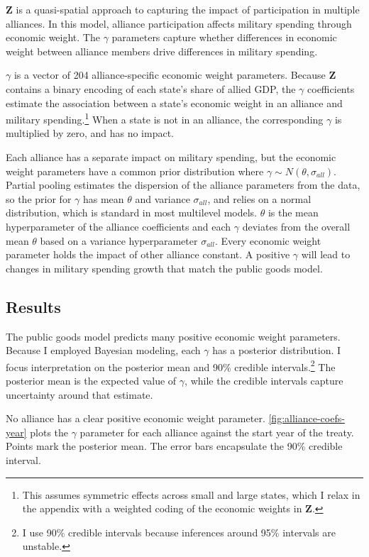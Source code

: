 \documentclass[12pt]{article}
\begin{document}
$\textbf{Z}$ is a quasi-spatial approach to capturing the impact of participation in multiple alliances.
In this model, alliance participation affects military spending through economic weight.  
The $\gamma$ parameters capture whether differences in economic weight between alliance members drive differences in military spending. 


$\gamma$ is a vector of 204 alliance-specific economic weight parameters.  
Because \textbf{Z} contains a binary encoding of each state's share of allied GDP, the $\gamma$ coefficients estimate the association between a state's economic weight in an alliance and military spending.\footnote{This assumes symmetric effects across small and large states, which I relax in the appendix with a weighted coding of the economic weights in $\textbf{Z}$.} 
When a state is not in an alliance, the corresponding $\gamma$ is multiplied by zero, and has no impact. 


Each alliance has a separate impact on military spending, but the economic weight parameters have a common prior distribution where $\gamma \sim N(\theta, \sigma_{all})$.
Partial pooling estimates the dispersion of the alliance parameters from the data, so the prior for $\gamma$ has mean $\theta$ and variance $\sigma_{all}$, and relies on a normal distribution, which is standard in most multilevel models.  
$\theta$ is the mean hyperparameter of the alliance coefficients and each $\gamma$ deviates from the overall mean $\theta$ based on a variance hyperparameter $\sigma_{all}$.
Every economic weight parameter holds the impact of other alliance constant. 
A positive $\gamma$ will lead to changes in military spending growth that match the public goods model. 
    


\subsection{Results} 


The public goods model predicts many positive economic weight parameters. 
Because I employed Bayesian modeling, each $\gamma$ has a posterior distribution.
I focus interpretation on the posterior mean and 90\% credible intervals.\footnote{I use 90\% credible intervals because inferences around 95\% intervals are unstable.}
The posterior mean is the expected value of $\gamma$, while the credible intervals capture uncertainty around that estimate.  


No alliance has a clear positive economic weight parameter.
\autoref{fig:alliance-coefs-year} plots the $\gamma$ parameter for each alliance against the start year of the treaty.
Points mark the posterior mean. 
The error bars encapsulate the 90\% credible interval.
\end{document}
